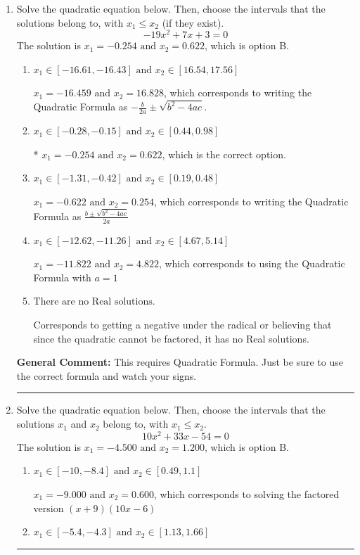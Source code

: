 \documentclass{extbook}[14pt]
\newcommand{\litem}[1]{\item #1

\rule{\textwidth}{0.4pt}}
\begin{document}
\begin{enumerate}\litem{
Solve the quadratic equation below. Then, choose the intervals that the solutions belong to, with $x_1 \leq x_2$ (if they exist).
\[ -19x^{2} +7 x + 3 = 0 \]The solution is \( x_1 = -0.254 \text{ and } x_2 = 0.622 \), which is option B.\begin{enumerate}[label=\Alph*.]
\item \( x_1 \in [-16.61, -16.43] \text{ and } x_2 \in [16.54, 17.56] \)

 $x_1 = -16.459 \text{ and } x_2 = 16.828$, which corresponds to writing the Quadratic Formula as $-\frac{b}{2a} \pm \sqrt{b^2 - 4ac}$.
\item \( x_1 \in [-0.28, -0.15] \text{ and } x_2 \in [0.44, 0.98] \)

* $x_1 = -0.254 \text{ and } x_2 = 0.622$, which is the correct option.
\item \( x_1 \in [-1.31, -0.42] \text{ and } x_2 \in [0.19, 0.48] \)

 $x_1 = -0.622 \text{ and } x_2 = 0.254$, which corresponds to writing the Quadratic Formula as $\frac{b \pm \sqrt{b^2 - 4ac}}{2a}$
\item \( x_1 \in [-12.62, -11.26] \text{ and } x_2 \in [4.67, 5.14] \)

 $x_1 = -11.822 \text{ and } x_2 = 4.822$, which corresponds to using the Quadratic Formula with $a=1$
\item \( \text{There are no Real solutions.} \)

Corresponds to getting a negative under the radical or believing that since the quadratic cannot be factored, it has no Real solutions.
\end{enumerate}

\textbf{General Comment:} This requires Quadratic Formula. Just be sure to use the correct formula and watch your signs.
}
\litem{
Solve the quadratic equation below. Then, choose the intervals that the solutions $x_1$ and $x_2$ belong to, with $x_1 \leq x_2$.
\[ 10x^{2} +33 x -54 = 0 \]The solution is \( x_1 = -4.500 \text{ and } x_2 = 1.200 \), which is option B.\begin{enumerate}[label=\Alph*.]
\item \( x_1 \in [-10, -8.4] \text{ and } x_2 \in [0.49, 1.1] \)

$x_1 = -9.000 \text{ and } x_2 = 0.600$, which corresponds to solving the factored version $(x + 9)(10x -6)$
\item \( x_1 \in [-5.4, -4.3] \text{ and } x_2 \in [1.13, 1.66] \)


\end{enumerate}}
\end{enumerate}
\end{document}
